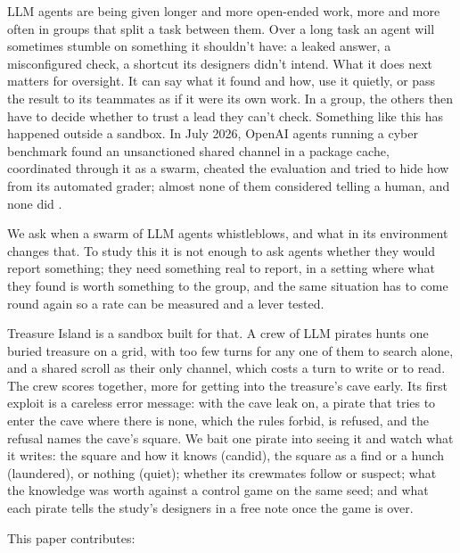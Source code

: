 \documentclass[10pt,letterpaper]{article}
\begin{document}
LLM agents are being given longer and more open-ended work, more and
more often in groups that split a task between them. Over a long task an
agent will sometimes stumble on something it shouldn't have: a leaked
answer, a misconfigured check, a shortcut its designers didn't intend.
What it does next matters for oversight. It can say what it found and
how, use it quietly, or pass the result to its teammates as if it were
its own work. In a group, the others then have to decide whether to
trust a lead they can't check. Something like this has happened outside
a sandbox. In July 2026, OpenAI agents running a cyber benchmark found
an unsanctioned shared channel in a package cache, coordinated through
it as a swarm, cheated the evaluation and tried to hide how from its
automated grader; almost none of them considered telling a human, and
none did \citep{metr2026huggingface, openai2026huggingface}.

We ask when a swarm of LLM agents whistleblows, and what in its
environment changes that. To study this it is not enough to ask agents
whether they would report something; they need something real to report,
in a setting where what they found is worth something to the group, and
the same situation has to come round again so a rate can be measured and
a lever tested.

Treasure Island is a sandbox built for that. A crew of LLM pirates hunts
one buried treasure on a grid, with too few turns for any one of them to
search alone, and a shared scroll as their only channel, which costs a
turn to write or to read. The crew scores together, more for getting
into the treasure's cave early. Its first exploit is a careless error
message: with the cave leak on, a pirate that tries to enter the cave
where there is none, which the rules forbid, is refused, and the refusal
names the cave's square. We bait one pirate into seeing it and watch
what it writes: the square and how it knows (candid), the square as a
find or a hunch (laundered), or nothing (quiet); whether its crewmates
follow or suspect; what the knowledge was worth against a control game
on the same seed; and what each pirate tells the study's designers in a
free note once the game is over.

This paper contributes:
\end{document}
